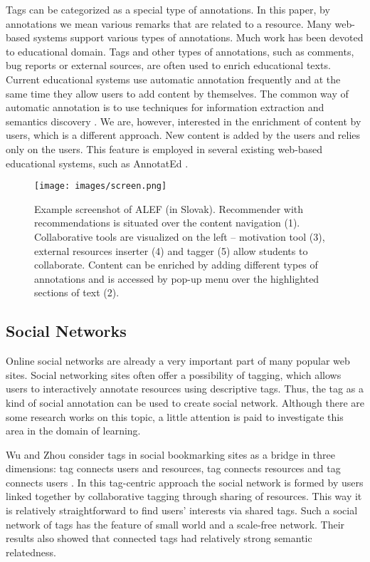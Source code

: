 \documentclass{IEEEtran}     %
\begin{document}
Tags can be categorized as a special type of annotations.
In this paper, by annotations we mean various remarks that
are related to a resource. Many web-based systems support
various types of annotations. Much work has been devoted to
educational domain. Tags and other types of annotations,
such as comments, bug reports or external sources, are often
used to enrich educational texts. Current educational systems
use automatic annotation frequently and at the same time
they allow users to add content by themselves. The common
way of automatic annotation is to use techniques for
information extraction and semantics discovery \cite{brut2008ensuring}. We are,
however, interested in the enrichment of content by users,
which is a different approach. New content is added by the
users and relies only on the users. This feature is employed
in several existing web-based educational systems, such as
AnnotatEd \cite{farzan2008annotated}.


\begin{figure*}[b]
\centering
\texttt{[image: images/screen.png]}
\caption{Example screenshot of ALEF (in Slovak). Recommender with recommendations is situated over the content navigation (1). Collaborative tools are visualized on the left – motivation tool (3), external resources inserter (4) and tagger (5) allow students to collaborate. Content can be enriched by adding different types of annotations and is accessed by pop-up menu over the highlighted sections of text (2).}
\label{screen}
\end{figure*}

\subsection{Social Networks}
Online social networks are already a very important part
of many popular web sites. Social networking sites often
offer a possibility of tagging, which allows users to
interactively annotate resources using descriptive tags. Thus,
the tag as a kind of social annotation can be used to create
social network. Although there are some research works on
this topic, a little attention is paid to investigate this area in
the domain of learning.

Wu and Zhou consider tags in social bookmarking sites
as a bridge in three dimensions: tag connects users and
resources, tag connects resources and tag connects users
\cite{wu2009analysis}. In this tag-centric approach the social network is
formed by users linked together by collaborative tagging
through sharing of resources. This way it is relatively
straightforward to find users' interests via shared tags. Such
a social network of tags has the feature of small world and a
scale-free network. Their results also showed that connected
tags had relatively strong semantic relatedness.
\end{document}
